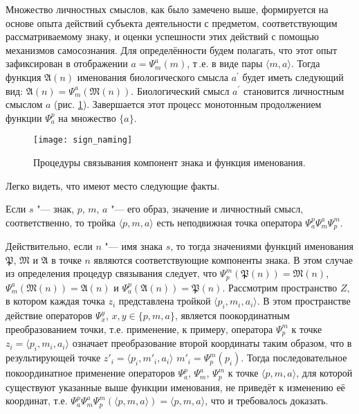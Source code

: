 Множество личностных смыслов, как было замечено выше, формируется на основе опыта действий субъекта деятельности с предметом, соответствующим рассматриваемому знаку, и оценки успешности этих действий с помощью механизмов самосознания. Для определённости будем полагать, что этот опыт зафиксирован в отображении $a=\Psi_m^a(m)$, т\,.е. в виде пары $\langle m,a\rangle$. Тогда функция $\mathfrak A(n)$ именования биологического смысла $a^\prime$ будет иметь следующий вид: $\mathfrak A(n)=\Psi_m^a(\mathfrak M(n))$. Биологический смысл $a^\prime$ становится личностным смыслом $a$ (рис. \ref{fg:sign_naming}). Завершается этот процесс монотонным продолжением функции $\Psi_a^p$ на множество $\{a\}$.

\begin{figure}[h]
	\centering
	\texttt{[image: sign\_naming]}
	\caption{Процедуры связывания компонент знака и функция именования.}
	\label{fg:sign_naming}
\end{figure}

Легко видеть, что имеют место следующие факты.
\begin{Pred}
	\label{pred:fixed_point}
	Если $s$ "--- знак, $p$, $m$, $a$ "--- его образ, значение и личностный смысл, соответственно, то тройка $\langle p,m,a\rangle$ есть неподвижная точка оператора $\Psi_a^p\Psi_m^a\Psi_p^m$.
\end{Pred}
\begin{Proof}
	Действительно, если $n$ "--- имя знака $s$, то тогда значениями функций именования $\mathfrak P$, $\mathfrak M$ и $\mathfrak A$ в точке $n$ являются соответствующие компоненты знака. В этом случае из определения процедур связывания следует, что $\Psi_p^m(\mathfrak P(n))=\mathfrak M(n)$, $\Psi_m^a(\mathfrak M(n))=\mathfrak A(n)$ и $\Psi_a^p(\mathfrak A(n))=\mathfrak P(n)$. Рассмотрим пространство $Z$, в котором каждая точка $z_i$ представлена тройкой $\langle p_i,m_i,a_i\rangle$. В этом пространстве действие операторов $\Psi_x^y$, $x,y\in\{p,m,a\}$, является поокординатным преобразованием точки, т.е. применение, к примеру, оператора $\Psi_p^m$ к точке $z_i=\langle p_i,m_i,a_i\rangle$ означает преобразование второй координаты таким образом, что в результирующей точке $z'_i=\langle p_i,m'_i,a_i\rangle$ $m'_i=\Psi_p^m(p_i)$. Тогда последовательное покоординатное применение операторов $\Psi_a^p$, $\Psi_m^a$, $\Psi_p^m$ к точке $\langle p,m,a\rangle$, для которой существуют указанные выше функции именования, не приведёт к изменению её координат, т.е. $\Psi_a^p\Psi_m^a\Psi_p^m(\langle p,m,a\rangle)=\langle p,m,a\rangle$, что и требовалось доказать.
\end{Proof}

